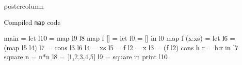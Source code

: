 \documentclass[final]{beamer}
\begin{document}
\begin{frame}[fragile]
\begin{columns}[T]
\begin{column}{.31\textwidth}
\begin{beamercolorbox}[wd=\textwidth]{postercolumn}
                \begin{block}{Compiled \texttt{map} code}
                    \begin{code}
main = let l10 = map  l9 l8
           map  f [] = let l0 = []
                       in l0
           map  f (x:xs) = let l6 = (map  l5 l4)
                               l7 = cons  l3 l6
                               l4 = xs
                               l5 = f
                               l2 = x
                               l3 = (f  l2)
                               cons  h r = h:r
                           in l7
           square n = n*n
           l8 = [1,2,3,4,5]
           l9 = square
       in print l10
                    \end{code}
                \end{block}
       \end{beamercolorbox}
                            \vfill
       \end{column}
    \end{columns}
\end{frame}
\end{document}
